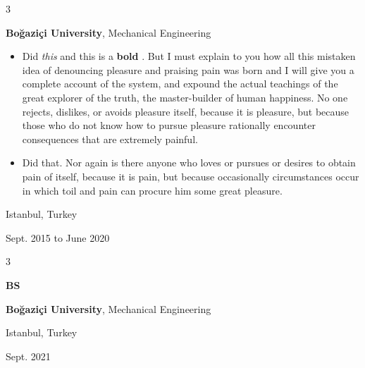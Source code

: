 \documentclass[10pt, letterpaper]{article}
\newenvironment{highlights}{
    \begin{itemize}[
        topsep=0.10 cm,
        parsep=0.10 cm,
        partopsep=0pt,
        itemsep=0pt,
        leftmargin=0.4 cm + 10pt
    ]
}{
    \end{itemize}
} %
\newenvironment{threecolentry}[3][]{
    \onecolentry
    \def\thirdColumn{#3}
    \setcolumnwidth{1 cm, \fill, 4.5 cm}
    \begin{paracol}{3}
    {\raggedright #2} \switchcolumn
}{
    \switchcolumn \raggedleft \thirdColumn
    \end{paracol}
    \endonecolentry
} %
\let\hrefWithoutArrow\href
\renewcommand{\href}[2]{\hrefWithoutArrow{#1}{\mbox{\ifthenelse{\equal{#2}{}}{ }{#2 }\raisebox{.15ex}{\footnotesize \faExternalLink*}}}}
\begin{document}
        \vspace{0.2 cm}

        \begin{threecolentry}{\textbf{}}{
            Istanbul, Turkey

        Sept. 2015 to June 2020
        }
            \textbf{Boğaziçi University}, Mechanical Engineering
            \begin{highlights}
                \item Did \textit{this} and this is a \textbf{bold} \href{https://example.com}{link}. But I must explain to you how all this mistaken idea of denouncing pleasure and praising pain was born and I will give you a complete account of the system, and expound the actual teachings of the great explorer of the truth, the master-builder of human happiness. No one rejects, dislikes, or avoids pleasure itself, because it is pleasure, but because those who do not know how to pursue pleasure rationally encounter consequences that are extremely painful.
                \item Did that. Nor again is there anyone who loves or pursues or desires to obtain pain of itself, because it is pain, but because occasionally circumstances occur in which toil and pain can procure him some great pleasure.
            \end{highlights}
        \end{threecolentry}

        \vspace{0.2 cm}

        \begin{threecolentry}{\textbf{BS}}{
            Istanbul, Turkey

        Sept. 2021
        }
            \textbf{Boğaziçi University}, Mechanical Engineering
        \end{threecolentry}

        \vspace{0.2 cm}
\end{document}
